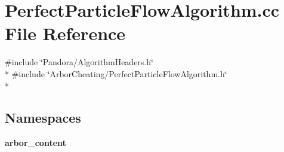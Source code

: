 \section{Perfect\+Particle\+Flow\+Algorithm.\+cc File Reference}
\label{PerfectParticleFlowAlgorithm_8cc}
{\ttfamily \#include \char`\"{}Pandora/\+Algorithm\+Headers.\+h\char`\"{}}\\*
{\ttfamily \#include \char`\"{}Arbor\+Cheating/\+Perfect\+Particle\+Flow\+Algorithm.\+h\char`\"{}}\\*
\subsection*{Namespaces}
\begin{DoxyCompactItemize}
\item 
 {\bf arbor\+\_\+content}
\end{DoxyCompactItemize}
